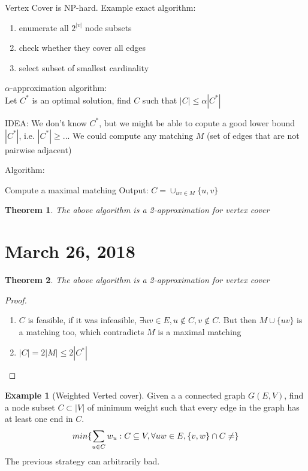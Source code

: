 \documentclass{article}
\theoremstyle{plain}
\newtheorem{thm}{Theorem}
\theoremstyle{definition}
\newtheorem{eg}{Example}
\begin{document}
Vertex Cover is NP-hard. Example exact algorithm:
\begin{enumerate}
    \item enumerate all $2^{|v|}$ node subsets
    \item check whether they cover all edges
    \item select subset of smallest cardinality
\end{enumerate}

$\alpha$-approximation algorithm:\\
Let $C^*$ is an optimal solution, find $C$ such that $|C|\leq \alpha|C^*|$

IDEA: We don't know $C^*$, but we might be able to copute a good lower bound
$|C^*|$, i.e. $|C^*|\geq ...$ We could compute any matching $M$ (set of edges that
are not pairwise adjacent)

Algorithm:
\begin{algorithmic}[1]
    \State Compute a maximal matching
    \State Output: $C = \cup_{uv\in M}\{u,v\}$
\end{algorithmic}

\begin{thm}
    The above algorithm is a 2-approximation for vertex cover
\end{thm}

\section{March 26, 2018}
\begin{thm}
    The above algorithm is a 2-approximation for vertex cover
\end{thm}

\begin{proof}
    \begin{enumerate}
        \item $C$ is feasible, if it was infeasible, $\exists uv\in E, u\not\in C,
            v\not\in C$. But then $M\cup \{uv\}$ is a matching too, which contradicts
            $M$ is a maximal matching
        \item $|C| = 2|M| \leq 2|C^*|$
    \end{enumerate}
\end{proof}

\begin{eg}[Weighted Verted cover]
    Given a a connected graph $G(E,V)$, find a node subset $C\subset |V|$ of minimum
    weight such that every edge in the graph has at least one end in $C$.
    \begin{align*}
        min\{\sum_{u\in C} w_u: C\subseteq V, \forall uw\in E, \{v, w\}\cap C\ne \empty\}
    \end{align*}
    The previous strategy can arbitrarily bad.
\end{eg}
\end{document}
